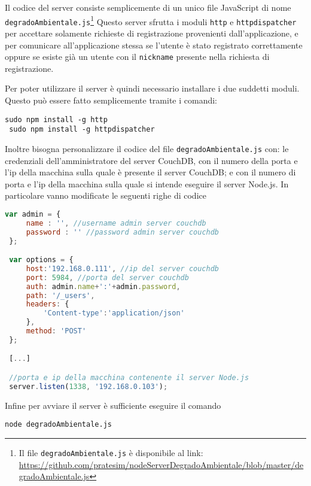         Il codice del server consiste semplicemente di un unico file
        JavaScript di nome \texttt{degradoAmbientale.js}\footnote{Il file
        \texttt{degradoAmbientale.js} è disponibile al link:
        \url{https://github.com/pratesim/nodeServerDegradoAmbientale/blob/master/degradoAmbientale.js}}
        Questo server sfrutta i moduli \texttt{http} e \texttt{httpdispatcher}
        per accettare solamente richieste di registrazione provenienti
        dall'applicazione, e per comunicare all'applicazione
        stessa se l'utente è stato registrato correttamente oppure se esiste
        già un utente con il \texttt{nickname} presente nella richiesta di
        registrazione.

        Per poter utilizzare il server è quindi necessario installare i due
        suddetti moduli. Questo può essere fatto semplicemente tramite i comandi:
        \begin{lstlisting}[language=plane]
 sudo npm install -g http
 sudo npm install -g httpdispatcher
        \end{lstlisting}

        Inoltre bisogna personalizzare il codice del file
        \texttt{degradoAmbientale.js} con: le credenziali dell'amministratore
        del server CouchDB, con il numero della porta e l'ip della
        macchina sulla quale è presente il server CouchDB; e con il numero
        di porta e l'ip della macchina sulla quale si intende eseguire il
        server Node.js.
        In particolare vanno modificate le seguenti righe di codice
        \begin{lstlisting}[language=JavaScript]
 var admin = {
     name : '', //username admin server couchdb
     password : '' //password admin server couchdb
 };

 var options = {
     host:'192.168.0.111', //ip del server couchdb
     port: 5984, //porta del server couchdb
     auth: admin.name+':'+admin.password,
     path: '/_users',
     headers: {
         'Content-type':'application/json'
     },
     method: 'POST'
 };

 [...]

 //porta e ip della macchina contenente il server Node.js
 server.listen(1338, '192.168.0.103');
        \end{lstlisting}

        Infine per avviare il server è sufficiente eseguire il comando
        \begin{lstlisting}[language=plane]
 node degradoAmbientale.js
        \end{lstlisting}
